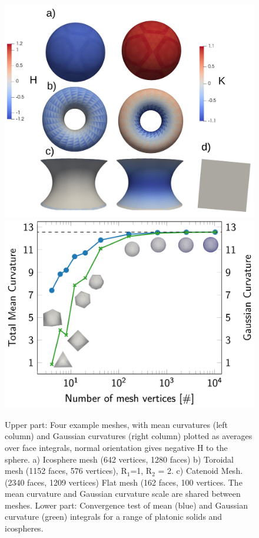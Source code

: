 \documentclass[twocolumn]{biophys-new}
\begin{document}
\begin{figure}[hbt]
\centering
\includegraphics[width=0.8\linewidth]{fig/upper_new.png} \\
\includegraphics[width=0.7\linewidth]{fig/mergedkh.png} 
\caption{Upper part: Four example meshes, with mean curvatures (left column) and Gaussian curvatures (right column) plotted as averages over face integrals, normal orientation gives negative H to the sphere. a) Icosphere mesh (642 vertices, 1280 faces) b) Toroidal mesh (1152 faces, 576 vertices), R$_1$=1, R$_2$ = 2. c) Catenoid Mesh. (2340 faces, 1209 vertices) Flat mesh (162 faces, 100 vertices. The mean curvature and Gaussian curvature scale are shared between meshes. Lower part: Convergence test of mean (blue) and Gaussian curvature (green) integrals for a range of platonic solids and icospheres.}
\label{fig:unittests}
\end{figure}
\end{document}
